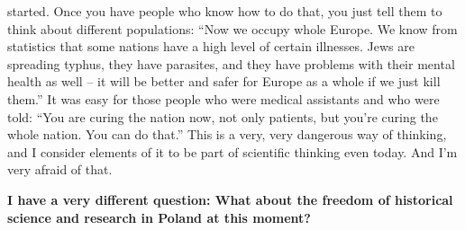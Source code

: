 started. Once you have people who know how to do that, you just tell them to think about different populations: ``Now we occupy whole Europe. We know from statistics that some nations have a high level of certain illnesses. Jews are spreading typhus, they have parasites, and they have problems with their mental health as well – it will be better and safer for Europe as a whole if we just kill them.'' It was easy for those people who were medical assistants and who were told: ``You are curing the nation now, not only patients, but you’re curing the whole nation. You can do that.'' This is a very, very dangerous way of thinking, and I consider elements of it to be part of scientific thinking even today. And I’m very afraid of that.

\textbf{I have a very different question: What about the freedom of historical science and research in Poland at this moment?} 

